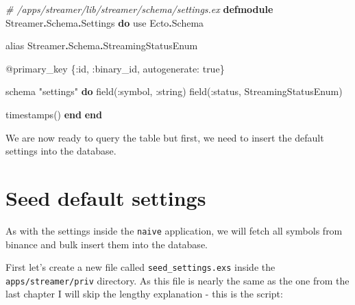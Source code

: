 \documentclass[
]{book}
\newenvironment{Shaded}{\begin{snugshade}}{\end{snugshade}}
\newcommand{\CommentTok}[1]{\textcolor[rgb]{0.56,0.35,0.01}{\textit{#1}}}
\newcommand{\ConstantTok}[1]{\textcolor[rgb]{0.00,0.00,0.00}{#1}}
\newcommand{\ImportTok}[1]{#1}
\newcommand{\KeywordTok}[1]{\textcolor[rgb]{0.13,0.29,0.53}{\textbf{#1}}}
\newcommand{\NormalTok}[1]{#1}
\newcommand{\OperatorTok}[1]{\textcolor[rgb]{0.81,0.36,0.00}{\textbf{#1}}}
\newcommand{\OtherTok}[1]{\textcolor[rgb]{0.56,0.35,0.01}{#1}}
\newcommand{\StringTok}[1]{\textcolor[rgb]{0.31,0.60,0.02}{#1}}
\newcommand{\VariableTok}[1]{\textcolor[rgb]{0.00,0.00,0.00}{#1}}
\begin{document}
\begin{Shaded}
\begin{Highlighting}[]
\CommentTok{\# /apps/streamer/lib/streamer/schema/settings.ex}
\KeywordTok{defmodule} \ConstantTok{Streamer}\OperatorTok{.}\ConstantTok{Schema}\OperatorTok{.}\ConstantTok{Settings} \KeywordTok{do}
  \ImportTok{use} \ConstantTok{Ecto}\OperatorTok{.}\ConstantTok{Schema}

  \ImportTok{alias} \ConstantTok{Streamer}\OperatorTok{.}\ConstantTok{Schema}\OperatorTok{.}\ConstantTok{StreamingStatusEnum}

  \OtherTok{@primary\_key}\NormalTok{ \{}\VariableTok{:id}\NormalTok{, }\VariableTok{:binary\_id}\NormalTok{, }\VariableTok{autogenerate:} \ConstantTok{true}\NormalTok{\}}

\NormalTok{  schema }\StringTok{"settings"} \KeywordTok{do}
\NormalTok{    field(}\VariableTok{:symbol}\NormalTok{, }\VariableTok{:string}\NormalTok{)}
\NormalTok{    field(}\VariableTok{:status}\NormalTok{, }\ConstantTok{StreamingStatusEnum}\NormalTok{)}

\NormalTok{    timestamps()}
  \KeywordTok{end}
\KeywordTok{end}
\end{Highlighting}
\end{Shaded}

We are now ready to query the table but first, we need to insert the default settings into the database.

\hypertarget{seed-default-settings}{%
\section{Seed default settings}\label{seed-default-settings}}

As with the settings inside the \texttt{naive} application, we will fetch all symbols from binance and bulk insert them into the database.

First let's create a new file called \texttt{seed\_settings.exs} inside the \texttt{apps/streamer/priv} directory. As this file is nearly the same as the one from the last chapter I will skip the lengthy explanation - this is the script:
\end{document}
